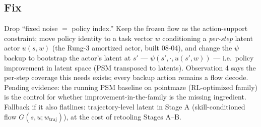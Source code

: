 \documentclass[11pt]{article}
\begin{document}
\subsection*{Fix}
Drop ``fixed noise $=$ policy index.'' Keep the frozen flow as the action-support
constraint; move policy identity to a task vector $w$ conditioning a \emph{per-step}
latent actor $u(s, w)$ (the Rung-3 amortized actor, built 08-04), and change the $\psi$
backup to bootstrap the actor's latent at $s'$ --- $\psi(s', \cdot, u(s',w))$ ---
i.e.\ policy improvement in latent space (PSM transposed to latents). Observation 4 says
the per-step coverage this needs exists; every backup action remains a flow decode.
Pending evidence: the running PSM baseline on pointmaze (RL-optimized family) is the
control for whether improvement-in-the-family is the missing ingredient. Fallback if it
also flatlines: trajectory-level latent in Stage A (skill-conditioned flow
$G(s, u; w_{\text{traj}})$), at the cost of retooling Stages A--B.
\end{document}

